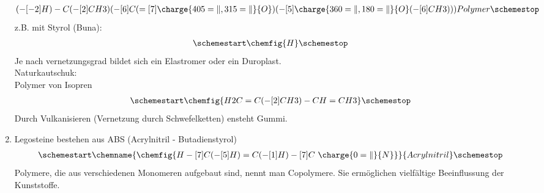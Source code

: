 \documentclass[../../main.tex]{subfiles}
\begin{document}
\begin{enumerate}[label=\alph*)]
\begin{align*}
{{                        	( -[-2]H)
                        -C
                            ( -[2]{CH3})
                            (-[6]C
                            	( =[7]\charge{405=\|, 315=\|}{O})
                            	( -[5]\charge{360=\|, 180=\|}{O}
                                    ( -[6]{CH3})
                            	)
                            )
                    }
                }
                {Polymer}
            \schemestop
        \end{align*}
        z.B. mit Styrol (Buna):
        \begin{align*}
            \schemestart
                \chemfig{
                    H
                }
            \schemestop
        \end{align*}
        Je nach vernetzungsgrad bildet sich ein Elastromer oder ein Duroplast.
        \\
        Naturkautschuk: \\
        Polymer von Isopren
        \begin{align*}
            \schemestart
                \chemfig{
                    {H2C}
                    =C
                        ( -[2]{CH3})
                    -{CH}
                    ={CH3}
                }
            \schemestop
        \end{align*}
        Durch Vulkanisieren (Vernetzung durch Schwefelketten) ensteht Gummi.
    \item Legosteine bestehen aus ABS (Acrylnitril - Butadienstyrol) \\
        \begin{align*}
            \schemestart
                \chemname{
                    \chemfig{
                        H
                        -[7]C
                            (-[5]H)
                        =C
                            ( -[1]H)
                        -[7]C
                        ~\charge{0=\|}{N}
                    }
                }
                {Acrylnitril}
            \schemestop
        \end{align*}
        Polymere, die aus verschiedenen Monomeren aufgebaut sind, nennt man
        Copolymere. Sie ermöglichen vielfältige Beeinflussung der Kunststoffe.
\end{enumerate}
%
%
\end{document}
